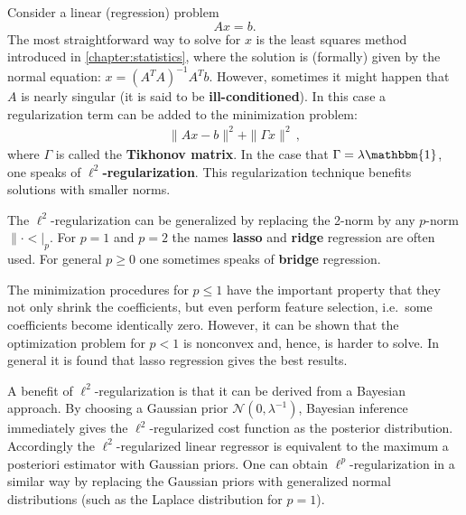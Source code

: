    \begin{method}{
        Consider a linear (regression) problem \[Ax = b.\] The most straightforward way to solve for $x$ is the least squares method introduced in \cref{chapter:statistics}, where the solution is (formally) given by the normal equation: $x=(A^TA)^{-1}A^Tb$. However, sometimes it might happen that $A$ is nearly singular (it is said to be \textbf{ill-conditioned}). In this case a regularization term can be added to the minimization problem:
        \begin{gather}
            \|Ax-b\|^2+\|\Gamma x\|^2\,,
        \end{gather}
        where $\Gamma$ is called the \textbf{Tikhonov matrix}. In the case that $\Gamma=\lambda\mathbbm{1}$, one speaks of \textbf{$\ell^2$-regularization}. This regularization technique benefits solutions with smaller norms.
    }
    \end{method}
    \begin{remark}
        The $\ell^2$-regularization can be generalized by replacing the 2-norm by any $p$-norm $\|\cdot<|_p$. For $p=1$ and $p=2$ the names \textbf{lasso} and \textbf{ridge} regression are often used. For general $p\geq0$ one sometimes speaks of \textbf{bridge} regression.

        The minimization procedures for $p\leq1$ have the important property that they not only shrink the coefficients, but even perform feature selection, i.e.~some coefficients become identically zero. However, it can be shown that the optimization problem for $p<1$ is nonconvex and, hence, is harder to solve. In general it is found that lasso regression gives the best results.

        A benefit of $\ell^2$-regularization is that it can be derived from a Bayesian approach. By choosing a Gaussian prior $\mathcal{N}(0,\lambda^{-1})$, Bayesian inference immediately gives the $\ell^2$-regularized cost function as the posterior distribution. Accordingly the $\ell^2$-regularized linear regressor is equivalent to the maximum a posteriori estimator with Gaussian priors. One can obtain $\ell^p$-regularization in a similar way by replacing the Gaussian priors with generalized normal distributions (such as the Laplace distribution for $p=1$).
    \end{remark}

